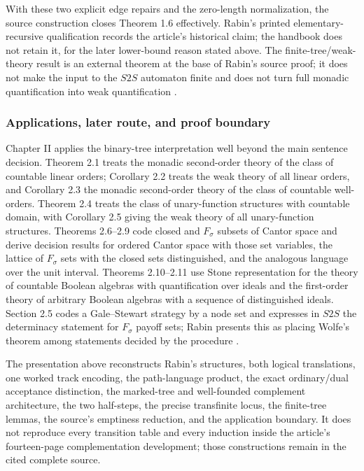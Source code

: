 With these two explicit edge repairs and the zero-length normalization, the
source construction closes Theorem 1.6 effectively.  Rabin's printed
elementary-recursive
qualification records the article's historical claim; the handbook does not
retain it, for the later lower-bound reason stated above.  The
finite-tree/weak-theory result is an external theorem at the base of Rabin's
source proof; it does not make the input to the \(S2S\) automaton finite and
does not turn full monadic quantification into weak quantification
\cite[pp.~32--34]{Rabin1969}.

\subsubsection{Applications, later route, and proof boundary}

Chapter II applies the binary-tree interpretation well beyond the main
sentence decision.  Theorem 2.1 treats the monadic second-order theory of the
class of countable linear orders; Corollary 2.2 treats the weak theory of all
linear orders, and Corollary 2.3 the monadic second-order theory of the class
of countable well-orders.  Theorem 2.4 treats the class of unary-function
structures with countable domain, with Corollary 2.5 giving the weak theory of
all unary-function structures.  Theorems 2.6--2.9 code closed and
\(F_\sigma\) subsets of Cantor space and derive decision results for ordered
Cantor space with those set variables, the lattice of \(F_\sigma\) sets with
the closed sets distinguished, and the analogous language over the unit
interval.  Theorems 2.10--2.11 use Stone representation for the theory of
countable Boolean algebras with quantification over ideals and the
first-order theory of arbitrary Boolean algebras with a sequence of
distinguished ideals.  Section 2.5 codes a Gale--Stewart strategy by a node set
and expresses in \(S2S\) the determinacy statement for \(F_\sigma\) payoff
sets; Rabin presents this as placing Wolfe's theorem among statements decided
by the procedure
\cite[pp.~10--17]{Rabin1969}.

The presentation above reconstructs Rabin's structures, both logical
translations, one worked track encoding, the path-language product, the exact
ordinary/dual acceptance distinction, the marked-tree and well-founded
complement architecture, the two half-steps, the precise transfinite locus,
the finite-tree lemmas, the source's emptiness reduction, and the application
boundary.  It does not reproduce every transition table and every induction
inside the article's fourteen-page complementation development; those
constructions remain in the cited complete source.


